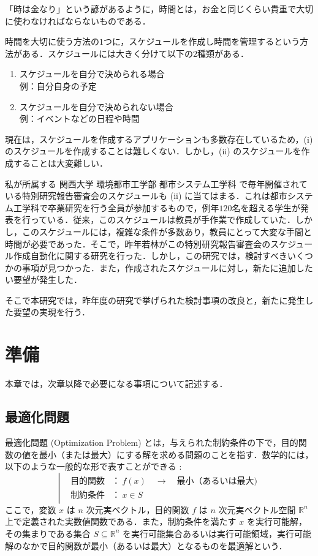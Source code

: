 \documentclass[a4paper,12pt,fleqn]{jarticle}
\begin{document}
「時は金なり」という諺があるように，時間とは，お金と同じくらい貴重で大切に使わなければならないものである．

時間を大切に使う方法の$1$つに，スケジュールを作成し時間を管理するという方法がある．スケジュールには大きく分けて以下の$2$種類がある．
\begin{enumerate}
  \renewcommand{\labelenumi}{(\roman{enumi})}
\item スケジュールを自分で決められる場合\\
  例：自分自身の予定
\item スケジュールを自分で決められない場合\\
  例：イベントなどの日程や時間
\end{enumerate}

現在は，スケジュールを作成するアプリケーションも多数存在しているため，(i) のスケジュールを作成することは難しくない．しかし，(ii) のスケジュールを作成することは大変難しい．

私が所属する 関西大学 環境都市工学部 都市システム工学科 で毎年開催されている特別研究報告審査会のスケジュールも (ii) に当てはまる．これは都市システム工学科で卒業研究を行う全員が参加するもので，例年$120$名を超える学生が発表を行っている．従来，このスケジュールは教員が手作業で作成していた．しかし，このスケジュールには，複雑な条件が多数あり，教員にとって大変な手間と時間が必要であった．そこで，昨年若林\cite{wakabayasi}がこの特別研究報告審査会のスケジュール作成自動化に関する研究を行った．しかし，この研究では，検討すべきいくつかの事項が見つかった．また，作成されたスケジュールに対し，新たに追加したい要望が発生した．

そこで本研究では，昨年度の研究で挙げられた検討事項の改良と，新たに発生した要望の実現を行う．
\newpage
\section{準備}
本章では，次章以降で必要になる事項について記述する．

\subsection{最適化問題}
最適化問題 (Optimization Problem) とは，与えられた制約条件の下で，目的関数の値を最小（または最大）にする解を求める問題のことを指す．数学的には，以下のような一般的な形で表すことができる \cite{Math} :
\begin{equation}
\left|
\begin{array}{lll}
&\text{目的関数}& ：\ f(x) \quad → \quad \text{最小（あるいは最大)}\\ \nonumber
&\text{制約条件}& ：\ x \in S \nonumber
\end{array}
\right.
\end{equation}
 ここで，変数 $x$ は $n$ 次元実ベクトル，目的関数 $f$ は $n$ 次元実ベクトル空間 $\mathbb{R}^n$ 上で定義された実数値関数である．また，制約条件を満たす $x$ を実行可能解，その集まりである集合 $S \subseteq \mathbb{R}^n$ を実行可能集合あるいは実行可能領域，実行可能解のなかで目的関数が最小（あるいは最大）となるものを最適解という．
\end{document}
